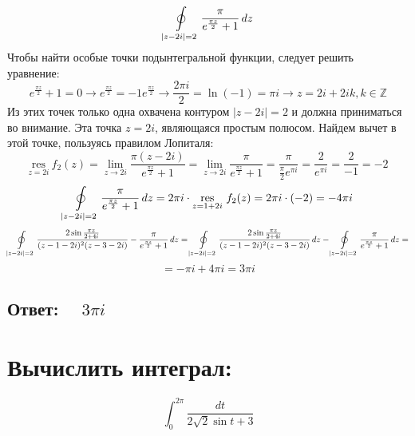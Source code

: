 \documentclass{article}
\begin{document}
        \[
          \ointop_{|z - 2i| = 2}  \frac{\pi}{e^{\frac{\pi z}{2}} + 1} \, dz
        \]
        Чтобы найти особые точки подынтегральной функции, следует решить уравнение: 
        $$e^{\frac{\pi z}{2}} + 1 = 0 \rightarrow e^{\frac{\pi z}{2}} = -1 e^{\frac{\pi z}{2}} \rightarrow \frac{2\pi i}{2} = \ln{(-1)} = \pi i \rightarrow z = 2i + 2ik, k \in \mathbb{Z}$$
        Из этих точек только одна охвачена контуром $|z - 2i| = 2$ и должна приниматься во внимание. Эта точка $z = 2i$, являющаяся простым полюсом. Найдем вычет в этой точке, пользуясь правилом Лопиталя:
        $$\underset{z = 2i}{\text{res}}\ f_2(z) =  \lim\limits_{z\rightarrow 2i}  \frac{\pi(z - 2i) }{e^{\frac{\pi z}{2} } + 1} =  \lim\limits_{z\rightarrow 2i} \frac{\pi}{e^{\frac{\pi z}{2}} + 1} = \frac{\pi}{\frac{\pi}{2}e^{\pi i}} = \frac{2}{e^{\pi i}} =\frac{2}{-1} = -2$$
        \[
          \ointop_{|z - 2i| = 2}  \frac{\pi}{e^{\frac{\pi z}{2}} + 1} \, dz = 2\pi i \cdot \underset{z = 1 + 2i}{\text{res}}\ f_2(z) = 2\pi i \cdot (-2) = -4\pi i 
        \]
        \[
        \ointop_{|z - 2i| = 2} \frac{2\sin{\frac{\pi z}{2 + 4i}}}{(z - 1 - 2i)^2 (z - 3 - 2i)} - \frac{\pi}{e^{\frac{\pi z}{2}} + 1} \, dz = \ointop_{|z - 2i| = 2} \frac{2\sin{\frac{\pi z}{2 + 4i}}}{(z - 1 - 2i)^2 (z - 3 - 2i)}\, dz - \ointop_{|z - 2i| = 2}  \frac{\pi}{e^{\frac{\pi z}{2}} + 1} \, dz = 
        \]
        $$= -\pi i + 4\pi i = 3\pi i$$
        \subsection{Ответ: $\quad 3\pi i$}
        \section{Вычислить интеграл: }
        \[
        \int_{0}^{2\pi} \frac{dt}{2\sqrt{2}\sin{t} + 3}
        \]
         
\end{document}
